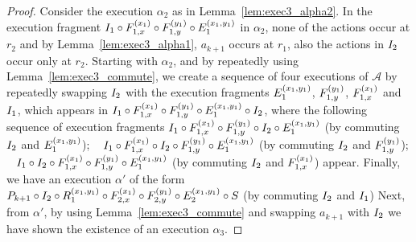 
\begin{proof}
Consider the execution $\alpha_2$ as in  Lemma~\ref{lem:exec3_alpha2}. 
In the execution fragment $ \fragt{I_1}{\alpha_2}{} \circ  \fragt{F_{1,x}}{\alpha_2}{x_1} \circ \fragt{F_{1,y}}{\alpha_2}{y_1} 
\circ \fragt{E_1}{\alpha_2}{x_1, y_1}$  in $\alpha_2$,  none of the actions occur at $r_2$ and  by Lemma~\ref{lem:exec3_alpha1}, $a_{k+1}$ occurs at $r_1$, 
also the actions in $\fragt{I_2}{}{}$ occur only at $r_2$.
%
Starting with $\alpha_2$, and by repeatedly using Lemma~\ref{lem:exec3_commute}, we create a sequence of four executions of $\mathcal{A}$ by repeatedly swapping 
 $\fragt{I_2}{\alpha_2}{}$ with the execution fragments 
$\fragt{E_1}{\alpha_2}{x_1, y_1}$, $\fragt{F_{1,y}}{\alpha_2}{y_1}$, $ \fragt{F_{1,x}}{\alpha_2}{x_1}$
and $\fragt{I_1}{\alpha_2}{}$, which appears in   $ \fragt{I_1}{\alpha_2}{} \circ  \fragt{F_{1,x}}{\alpha_2}{x_1} \circ \fragt{F_{1,y}}{\alpha_2}{y_1} 
\circ \fragt{E_1}{\alpha_2}{x_1, y_1}
\circ \fragt{I_2}{\alpha_2}{}$, 
where the following sequence of execution fragments
 $ \fragt{I_1}{\alpha_2}{} \circ  \fragt{F_{1,x}}{\alpha_2}{x_1} \circ \fragt{F_{1,y}}{\alpha_2}{y_1}  \circ \fragt{I_2}{\alpha_2}{} \circ \fragt{E_1}{\alpha_2}{x_1, y_1}$ (by commuting  $\fragt{I_2}{\alpha_2}{}$  and $\fragt{E_1}{\alpha_2}{x_1, y_1}$); ~
 $ \fragt{I_1}{\alpha_2}{} \circ  \fragt{F_{1,x}}{\alpha_2}{x_1} \circ \fragt{I_2}{\alpha_2}{}  \circ \fragt{F_{1,y}}{\alpha_2}{y_1} \circ \fragt{E_1}{\alpha_2}{x_1, y_1}$ (by commuting $\fragt{I_2}{\alpha_2}{}$  and $\fragt{F_{1,y}}{\alpha_2}{y_1}$); ~
 $ \fragt{I_1}{\alpha_2}{} \circ  \fragt{I_2}{\alpha_2}{}  \circ \fragt{F_{1,x}}{\alpha_2}{x_1} \circ \fragt{F_{1,y}}{\alpha_2}{y_1} \circ \fragt{E_1}{\alpha_2}{x_1, y_1}$ (by commuting   $\fragt{I_2}{\alpha_2}{}$  and $\fragt{F_{1,x}}{\alpha_2}{x_1}$)
appear. Finally, we have an  execution $\alpha'$ of the form 
$ \finiteprefixA{k}{k+1} \circ  \fragt{I_2}{\alpha''}{} \circ 
\frage{R_1}{}{x_1, y_1}
\circ \fragt{F_{2,x}}{\alpha'}{x_1} \circ \fragt{F_{2,y}}{\alpha'}{y_1} \circ \fragt{E_2}{\alpha_3'}{x_1, y_1}
\circ \fragt{S}{\alpha'}{}$ (by commuting $\fragt{I_2}{\alpha_2}{}$ and $\fragt{I_1}{\alpha_2}{}$)
Next, from $\alpha'$, by using Lemma~\ref{lem:exec3_commute}  and swapping $a_{k+1}$ with $\fragt{I_2}{\alpha_2}{}$ 
we have shown the existence  of  an execution 
 $\alpha_3$.
\end{proof}

